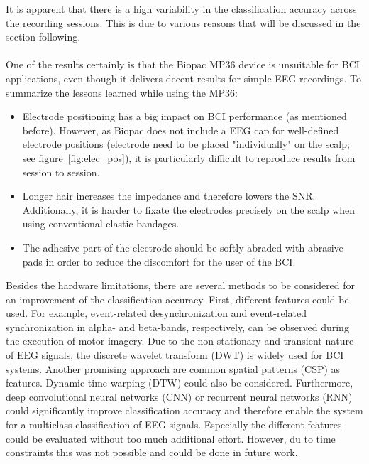 \documentclass[a4paper,oneside, openright,12pt]{report}
\begin{document}
It is apparent that there is a high variability in the classification accuracy across the recording sessions. This is due to various reasons that will be discussed in the section following.\\\\
One of the results certainly is that the Biopac MP36 device is unsuitable for BCI applications, even though it delivers decent results for simple EEG recordings. To summarize the lessons learned while using the MP36:
\begin{itemize}
	\item Electrode positioning has a big impact on BCI performance (as mentioned before). However, as Biopac does not include a EEG cap for well-defined electrode positions (electrode need to be placed "individually" on the scalp; see figure~\ref{fig:elec_pos}), it is particularly difficult to reproduce results from session to session.
	\item Longer hair increases the impedance and therefore lowers the SNR. Additionally, it is harder to fixate the electrodes precisely on the scalp when using conventional elastic bandages.
	\item The adhesive part of the electrode should be softly abraded with abrasive pads in order to reduce the discomfort for the user of the BCI.
\end{itemize}

Besides the hardware limitations, there are several methods to be considered for an improvement of the classification accuracy. First, different features could be used. For example, event-related desynchronization and event-related synchronization in alpha- and beta-bands, respectively, can be observed during the execution of motor imagery. Due to the non-stationary and transient nature of EEG signals, the discrete wavelet transform (DWT) is widely used for BCI systems. Another promising approach are common spatial patterns (CSP) as features. Dynamic time warping (DTW) could also be considered. Furthermore, deep convolutional neural networks (CNN) or recurrent neural networks (RNN) could significantly improve classification accuracy and therefore enable the system for a multiclass classification of EEG signals. Especially the different features could be evaluated without too much additional effort. However, du to time constraints this was not possible and could be done in future work.

\end{document}
